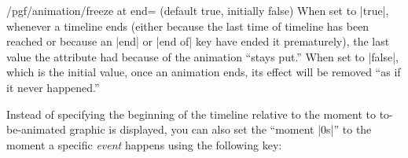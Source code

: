 \begin{key}{/pgf/animation/freeze at end= (default
  true, initially false)}
  When set to |true|, whenever a timeline ends (either because the
  last time of timeline has been reached or because an |end| or
  |end of| key have ended it prematurely), the last value the
  attribute had because of the animation ``stays put.'' When set to
  |false|, which is the initial value, once an animation ends, its
  effect will be removed ``as if it never happened.''
\begin{codeexample}[width=2cm]
\end{codeexample}
\end{key}

Instead of specifying the beginning of the timeline relative to the
moment to to-be-animated graphic is displayed, you can also set the
``moment |0s|'' to the moment a specific \emph{event} happens using
the following key:

